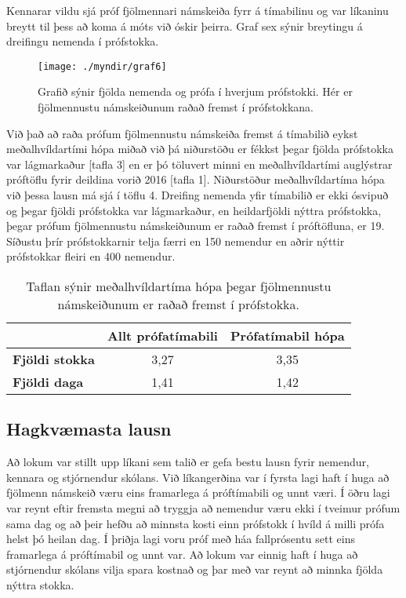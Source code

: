\documentclass[12pt]{article}
\begin{document}
Kennarar vildu sjá próf fjölmennari námskeiða fyrr á tímabilinu og var líkaninu breytt til þess að koma á móts við óskir þeirra. Graf sex sýnir breytingu á dreifingu nemenda í prófstokka.


\begin{figure}[h]
    \centering
    \texttt{[image: ./myndir/graf6]}
    \caption{Grafið sýnir fjölda nemenda og prófa í hverjum prófstokki. Hér er fjölmennustu námskeiðunum raðað fremst í prófstokkana.}
\end{figure}

\newpage

Við það að raða prófum fjölmennustu námskeiða fremst á tímabilið eykst meðalhvíldartími hópa miðað við þá niðurstöðu er fékkst þegar fjölda prófstokka var lágmarkaður [tafla 3] en er þó töluvert minni en meðalhvíldartími auglýstrar próftöflu fyrir deildina vorið 2016 [tafla 1]. Niðurstöður meðalhvíldartíma hópa við þessa lausn má sjá í töflu 4.
Dreifing nemenda yfir tímabilið er ekki ósvipuð og þegar fjöldi prófstokka var lágmarkaður, en heildarfjöldi nýttra prófstokka, þegar prófum fjölmennustu námskeiðunum er raðað fremst í próftöfluna, er 19. Síðustu þrír prófstokkarnir telja færri en 150 nemendur en aðrir nýttir prófstokkar fleiri en 400 nemendur.


\begin{table}[h]
    \centering
    \begin{tabular}{l|c|c|}
        \cline{2-3}
        & \multicolumn{1}{l|}{\textbf{Allt prófatímabili}} & \multicolumn{1}{l|}{\textbf{Prófatímabil hópa}} \\ \hline
        \multicolumn{1}{|l|}{\textbf{Fjöldi stokka}} & 3,27                                             & 3,35                                            \\ \hline
        \multicolumn{1}{|l|}{\textbf{Fjöldi daga}}   & 1,41                                             & 1,42                                            \\ \hline
    \end{tabular}
    \caption{Taflan sýnir meðalhvíldartíma hópa þegar fjölmennustu námskeiðunum er raðað fremst í prófstokka.}
\end{table}
\newpage

\subsection{Hagkvæmasta lausn}

Að lokum var stillt upp líkani sem talið er gefa bestu lausn fyrir nemendur, kennara og stjórnendur skólans.  Við líkangerðina var í fyrsta lagi haft í huga að fjölmenn námskeið væru eins framarlega á próftímabili og unnt væri. Í öðru lagi var reynt eftir fremsta megni að tryggja að nemendur væru ekki í tveimur prófum sama dag og að þeir hefðu að minnsta kosti einn prófstokk í hvíld á milli prófa helst þó heilan dag. Í þriðja lagi voru próf með háa fallprósentu sett eins framarlega á próftímabil og unnt var. Að lokum var einnig haft í huga að stjórnendur skólans vilja spara kostnað og þar með var reynt að minnka fjölda nýttra stokka. 
\end{document}
